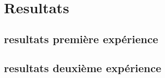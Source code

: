 \section{Resultats}
\label{sec:resultats}

\subsection{resultats première expérience}

\subsection{resultats deuxième expérience}
